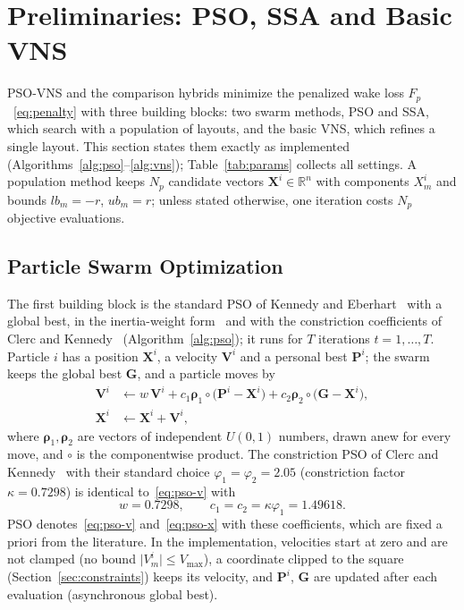 \section{Preliminaries: PSO, SSA and Basic VNS}
\label{sec:prelim}
\makeatletter{}\makeatother
PSO-VNS and the comparison hybrids minimize the penalized wake loss $F_p$~\eqref{eq:penalty} with three building blocks: two swarm methods, PSO and SSA, which search with a population of layouts, and the basic VNS, which refines a single layout. This section states them exactly as implemented (Algorithms~\ref{alg:pso}--\ref{alg:vns}); Table~\ref{tab:params} collects all settings. A population method keeps $N_p$ candidate vectors $\mathbf X^i\in\mathbb R^{n}$ with components $X^i_m$ and bounds $lb_m=-r$, $ub_m=r$; unless stated otherwise, one iteration costs $N_p$ objective evaluations.

\subsection{Particle Swarm Optimization}
\label{sec:pso}
The first building block is the standard PSO of Kennedy and Eberhart~\cite{Kennedy1995} with a global best, in the inertia-weight form~\cite{Shi1998} and with the constriction coefficients of Clerc and Kennedy~\cite{Clerc2002} (Algorithm~\ref{alg:pso}); it runs for $T$ iterations $t=1,\ldots,T$. Particle $i$ has a position $\mathbf X^i$, a velocity $\mathbf V^i$ and a personal best $\mathbf P^i$; the swarm keeps the global best $\mathbf G$, and a particle moves by
\begin{align}
\mathbf V^i&\leftarrow w\,\mathbf V^i+c_1\boldsymbol\rho_1\circ\bigl(\mathbf P^i-\mathbf X^i\bigr)+c_2\boldsymbol\rho_2\circ\bigl(\mathbf G-\mathbf X^i\bigr),\label{eq:pso-v}\\
\mathbf X^i&\leftarrow\mathbf X^i+\mathbf V^i,\label{eq:pso-x}
\end{align}
where $\boldsymbol\rho_1,\boldsymbol\rho_2$ are vectors of independent $U(0,1)$ numbers, drawn anew for every move, and $\circ$ is the componentwise product. The constriction PSO of Clerc and Kennedy~\cite{Clerc2002} with their standard choice $\varphi_1=\varphi_2=2.05$ (constriction factor $\kappa=0.7298$) is identical to~\eqref{eq:pso-v} with
\begin{equation}
w=0.7298,\qquad c_1=c_2=\kappa\varphi_1=1.49618 .
\label{eq:constriction}
\end{equation}
PSO denotes~\eqref{eq:pso-v} and~\eqref{eq:pso-x} with these coefficients, which are fixed a priori from the literature. In the implementation, velocities start at zero and are not clamped (no bound $\lvert V^i_m\rvert\le V_{\max}$), a coordinate clipped to the square (Section~\ref{sec:constraints}) keeps its velocity, and $\mathbf P^i$, $\mathbf G$ are updated after each evaluation (asynchronous global best).

